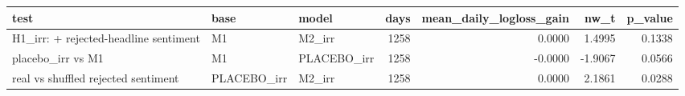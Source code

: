 \begin{tabular}{lllrrrr}
\toprule
test & base & model & days & mean\_daily\_logloss\_gain & nw\_t & p\_value \\
\midrule
H1\_irr: + rejected-headline sentiment & M1 & M2\_irr & 1258 & 0.0000 & 1.4995 & 0.1338 \\
placebo\_irr vs M1 & M1 & PLACEBO\_irr & 1258 & -0.0000 & -1.9067 & 0.0566 \\
real vs shuffled rejected sentiment & PLACEBO\_irr & M2\_irr & 1258 & 0.0000 & 2.1861 & 0.0288 \\
\bottomrule
\end{tabular}
